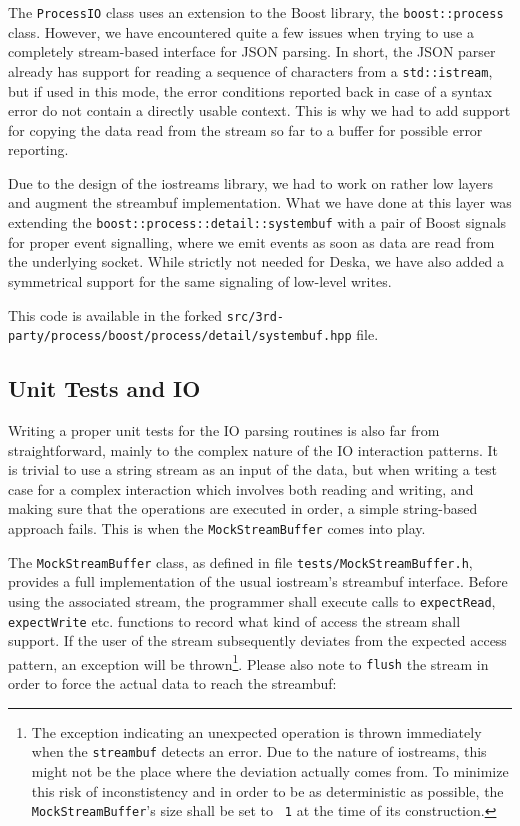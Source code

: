 \documentclass[deska]{subfiles}
\begin{document}
The {\tt ProcessIO} class uses an extension to the Boost library, the {\tt boost::process} class.  However, we have
encountered quite a few issues when trying to use a completely stream-based interface for JSON parsing.  In short, the
JSON parser already has support for reading a sequence of characters from a {\tt std::istream}, but if used in this
mode, the error conditions reported back in case of a syntax error do not contain a directly usable context.  This is
why we had to add support for copying the data read from the stream so far to a buffer for possible error reporting.

Due to the design of the iostreams library, we had to work on rather low layers and augment the streambuf
implementation.  What we have done at this layer was extending the {\tt boost::process::detail::systembuf} with a pair
of Boost signals for proper event signalling, where we emit events as soon as data are read from the underlying socket.
While strictly not needed for Deska, we have also added a symmetrical support for the same signaling of low-level
writes.

This code is available in the forked {\tt src/3rd-party/process/boost/process/detail/systembuf.hpp} file.

\subsection{Unit Tests and IO}

Writing a proper unit tests for the IO parsing routines is also far from straightforward, mainly to the complex nature
of the IO interaction patterns.  It is trivial to use a string stream as an input of the data, but when writing a test
case for a complex interaction which involves both reading and writing, and making sure that the operations are executed
in order, a simple string-based approach fails.  This is when the {\tt MockStreamBuffer} comes into play.

The {\tt MockStreamBuffer} class, as defined in file {\tt tests/MockStreamBuffer.h}, provides a full implementation of
the usual iostream's streambuf interface.  Before using the associated stream, the programmer shall execute calls to
{\tt expectRead}, {\tt expectWrite} etc. functions to record what kind of access the stream shall support.  If the user
of the stream subsequently deviates from the expected access pattern, an exception will be thrown\footnote{The exception
indicating an unexpected operation is thrown immediately when the {\tt streambuf} detects an error.  Due to the nature
of iostreams, this might not be the place where the deviation actually comes from.  To minimize this risk of
inconstistency and in order to be as deterministic as possible, the {\tt MockStreamBuffer}'s size shall be set to {\tt
1} at the time of its construction.}.  Please also note to {\tt flush} the stream in order to force the actual data to
reach the streambuf:
\end{document}
